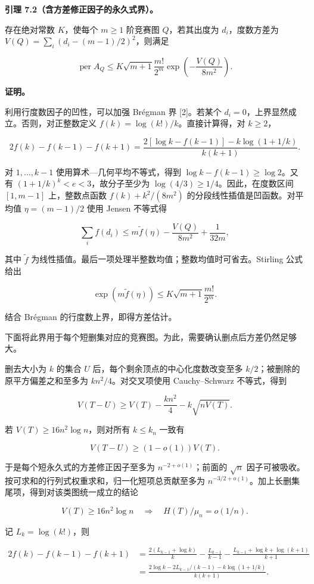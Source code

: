 \documentclass[11pt,a4paper]{article}
\begin{document}
\textbf{引理 7.2（含方差修正因子的永久式界）。}

存在绝对常数 \(K\)，使每个 \(m\ge1\) 阶竞赛图 \(Q\)，若其出度为 \(d_i\)，度数方差为 \(V(Q)=\sum_i(d_i-(m-1)/2)^2\)，则满足

\[\operatorname{per}A_Q\le
K\sqrt{m+1}\frac{m!}{2^m}\exp\left(-\frac{V(Q)}{8m^2}\right).\]

\textbf{证明。}

利用行度数因子的凹性，可以加强 Brégman 界 {[}2{]}。若某个 \(d_i=0\)，上界显然成立。否则，对正整数定义 \(f(k)=\log(k!)/k\)。直接计算得，对 \(k\ge2\)，

\[2f(k)-f(k-1)-f(k+1)
=\frac{2[\log k-f(k-1)]-k\log(1+1/k)}{k(k+1)}.\]

对 \(1,\ldots,k-1\) 使用算术---几何平均不等式，得到 \(\log k-f(k-1)\ge\log2\)。又有 \((1+1/k)^k<e<3\)，故分子至少为 \(\log(4/3)\ge1/4\)。因此，在度数区间 \([1,m-1]\) 上，整数点函数 \(f(k)+k^2/(8m^2)\) 的分段线性插值是凹函数。对平均值 \(\eta=(m-1)/2\) 使用 Jensen 不等式得

\[\sum_i f(d_i)
\le m\widetilde f(\eta)-\frac{V(Q)}{8m^2}+\frac{1}{32m},\]

其中 \(\widetilde f\) 为线性插值。最后一项处理半整数均值；整数均值时可省去。Stirling 公式给出

\[\exp(m\widetilde f(\eta))\le K\sqrt{m+1}\frac{m!}{2^m}.\]

结合 Brégman 的行度数上界，即得方差估计。

下面将此界用于每个短删集对应的竞赛图。为此，需要确认删点后方差仍然足够大。

删去大小为 \(k\) 的集合 \(U\) 后，每个剩余顶点的中心化度数改变至多 \(k/2\)；被删除的原平方偏差之和至多为 \(kn^2/4\)。对交叉项使用 Cauchy--Schwarz 不等式，得到

\[V(T-U)\ge V(T)-\frac{kn^2}{4}-k\sqrt{nV(T)}.\]

若 \(V(T)\ge16n^2\log n\)，则对所有 \(k\le k_n\) 一致有

\[V(T-U)\ge(1-o(1))V(T).\]

于是每个短永久式的方差修正因子至多为 \(n^{-2+o(1)}\)；前面的 \(\sqrt n\) 因子可被吸收。按可求和的行列式权重求和，归一化短项总贡献至多为 \(n^{-3/2+o(1)}\)。加上长删集尾项，得到对该类图统一成立的结论

\[V(T)\ge16n^2\log n\quad\Longrightarrow\quad
H(T)/\mu_n=o(1/n).\]

记 \(L_k=\log(k!)\)，则

\[\begin{aligned}
2f(k)-f(k-1)-f(k+1)
&=\frac{2(L_{k-1}+\log k)}k-\frac{L_{k-1}}{k-1}
-\frac{L_{k-1}+\log k+\log(k+1)}{k+1}\\
&=\frac{2\log k-2L_{k-1}/(k-1)-k\log(1+1/k)}{k(k+1)}.
\end{aligned}\]
\end{document}
